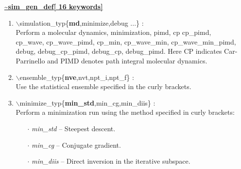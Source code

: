 \begin{itemize}
\huge
\item[] \underline{\bf \~{}sim\_gen\_def[ 16 keywords]}
\begin{enumerate}
 \vspace{0.15in} \Large
 \item $\backslash$simulation\_typ\{{\bf md},minimize,debug ...\} : \\
     \large
     Perform a molecular dynamics, minimization, pimd, cp
     cp\_pimd, cp\_wave, cp\_wave\_pimd, cp\_min, cp\_wave\_min,
     cp\_wave\_min\_pimd,
     debug, debug\_cp\_pimd, debug\_cp, debug\_pimd. Here CP indicates
     Car-Parrinello and PIMD  denotes path integral molecular dynamics.

 \vspace{0.15in} \Large
 \item  $\backslash$ensemble\_typ\{{\bf nve},nvt,npt\_i,npt\_f\} : \\
     \large
     Use the statistical ensemble specified in the curly brackets.

 \vspace{0.15in} \Large
 \item  $\backslash$minimize\_typ\{{\bf min\_std},min\_cg,min\_diis\} : \\
     \large
     Perform a minimization run using the method specified in curly brackets:
     \begin{itemize}
        \item[$\cdot$] {\it min\_std} -- Steepest descent.
        \item[$\cdot$] {\it min\_cg} -- Conjugate gradient.
        \item[$\cdot$] {\it min\_diis} -- Direct inversion in the 
                                          iterative subspace.
     \end{itemize}


\end{enumerate}
\end{itemize}
